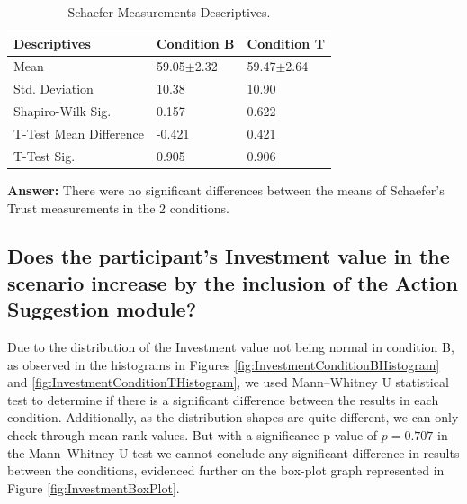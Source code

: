 \begin{table}[h]
    \centering
    \begin{tabular}{|l|l|l|}
        \hline
        \textbf{Descriptives}       &  \textbf{Condition B}     & \textbf{Condition T}  \\ \hline
        Mean                        &  59.05$\pm$2.32           & 59.47$\pm$2.64        \\ \hline
        Std. Deviation              &  10.38                    & 10.90                 \\ \hline
        Shapiro-Wilk Sig.           &  0.157                    & 0.622                 \\ \hline
        T-Test Mean Difference      &  -0.421                   & 0.421                 \\ \hline
        T-Test Sig.                 &  0.905                    & 0.906                 \\ \hline
    \end{tabular}
    \caption{Schaefer Measurements Descriptives.}
    \label{tbl:SchaeferMeasurementsDescriptives}
\end{table}

\textbf{Answer:} There were no significant differences between the means of Schaefer's Trust measurements in the 2 conditions.


\subsection*{Does the participant's Investment value in the scenario increase by the inclusion of the Action Suggestion module?}
Due to the distribution of the Investment value not being normal in condition B, as observed in the histograms in Figures \ref{fig:InvestmentConditionBHistogram} and \ref{fig:InvestmentConditionTHistogram}, we used Mann–Whitney U statistical test to determine if there is a significant difference between the results in each condition. Additionally, as the distribution shapes are quite different, we can only check through mean rank values. But with a significance p-value of $p=0.707$ in the Mann–Whitney U test we cannot conclude any significant difference in results between the conditions, evidenced further on the box-plot graph represented in Figure \ref{fig:InvestmentBoxPlot}.


